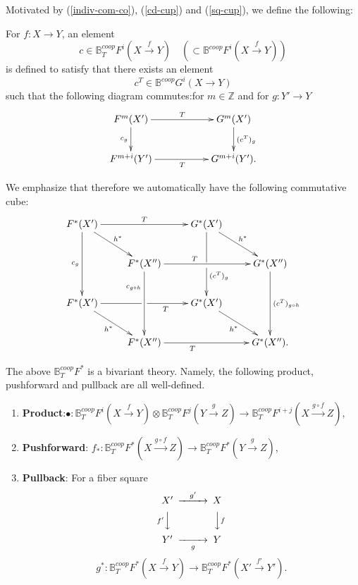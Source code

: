\documentclass[a4paper]{amsart}
\begin{document}
Motivated by (\ref{indiv-com-co}), (\ref{cd-cup}) and  (\ref{sq-cup}), 
we define the following:
\begin{defn}\label{4-defn-bcoop} For $f:X \to Y$,  
an element
$$c \in  \mathbb B^{coop}_T F^i(X \xrightarrow f Y) \quad (\subset \mathbb B^{coop}F^i(X \xrightarrow f Y) )$$
is defined to satisfy
that there exists an element  
$$c^T \in  \mathbb B^{coop} G^i(X \to Y)$$
such that
the following diagram commutes:for $m \in \mathbb Z$ and for $g:Y' \to Y$
\begin{equation}\label{cd-7}
\xymatrix
{F^m(X') \ar[d]_{c_g} \ar[rr]^T && G^m(X') \ar[d]^{(c^T)_g}\\
F^{m+i}(Y') \ar[rr]_T && G^{m+i}(Y').
}
\end{equation}
\end{defn}
\begin{rem}\label{T-coop}
We emphasize that therefore we automatically have the following commutative cube:
\begin{equation}\label{ccube-2}
\xymatrix
{ F^*(X') \ar[dd]_{c_g } \ar[rd]^{h^*} \ar[rr]^{T} && G^*(X') \ar'[d][dd]^(.3){(c^T)_g} \ar[rd]^{h^*} \\
& F^*(X'') \ar[dd]_(.3){ c_{g \circ h}} \ar[rr]^(.4){T}  &&  G^*(X'') \ar[dd]^{(c^T)_{g \circ h}} \\
F^*(X') \ar'[r] [rr]_{T \quad \quad }  \ar[rd]_{h^*} && G^*(X') \ar[rd]_{h^*} \\
& F^*(X'') \ar[rr] _{T \quad \quad  \quad }  &&  G^*(X'').
}
\end{equation}
\end{rem}
\begin{thm}
The above $\mathbb B^{coop}_T F^*$ is a bivariant theory. Namely, the following product, pushforward and pullback are all well-defined.
\begin{enumerate}
\item {\bf Product}:\quad $\bullet: \mathbb B^{coop}_TF^i(X \xrightarrow f Y) \otimes \mathbb B^{coop}_TF^j(Y \xrightarrow g Z) \to \mathbb B^{coop}_TF^{i+j}(X \xrightarrow {g \circ f} Z)$,
\item {\bf Pushforward}: \quad $f_*: \mathbb B^{coop}_TF^*(X \xrightarrow {g \circ f} Z) \to \mathbb B^{coop}_TF^*(Y \xrightarrow g Z)$,
\item {\bf Pullback}: For a fiber square 
$$\CD
X' @> {g'}  >> X\\
@V {f'} VV @VV fV\\
Y' @>> {g} > Y\\
\endCD
$$
$$g^*: \mathbb B^{coop}_TF^*(X \xrightarrow f Y ) \to \mathbb B^{coop}_TF^*(X' \xrightarrow {f'} Y' ).$$
\end{enumerate} 
\end{thm}
\end{document}
